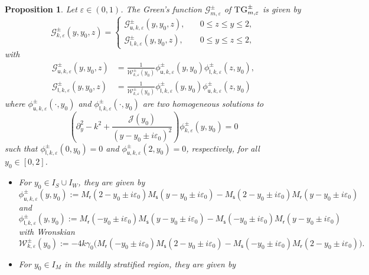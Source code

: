 \documentclass[11pt,reqno]{amsproc}
\newtheorem{proposition}{Proposition}[section]
\theoremstyle{definition}
\numberwithin{equation}{section}
\newcommand{\G}{{\mathcal{G}}}
\newcommand{\cJ}{{\mathcal{J}}}
\newcommand{\sr}{{\mathsf{r}}}
\newcommand{\s}{{\mathsf{s}}}
\newcommand{\su}{{\mathsf{u}}}
\renewcommand{\sl}{{\mathsf{l}}}
\newcommand{\W}{{\mathcal{W}}}
\newcommand{\ep}{\varepsilon}
\newcommand{\p}{\partial}
\begin{document}
\begin{proposition}\label{prop: def Green's Function}
Let  $\ep\in(0,1)$. The Green's function $\G_{m,\ep}^\pm$ of  $\textsc{TG}_{m,\ep}^\pm$
is given by
\begin{equation}\label{eq:Greens TG}
\G_{k,\ep}^\pm(y,y_0,z)=
\begin{cases}
\G_{\su,k,\ep}^\pm(y,y_0,z), \quad &0\leq z\leq y\leq 2,\\
\G_{\sl,k,\ep}^\pm(y,y_0,z), \quad &0\leq y\leq z\leq 2,
\end{cases}
\end{equation}
with
\begin{align}\label{ed:defGuGl}
\G_{\su,k,\ep}^\pm(y,y_0,z) &= \frac{1}{\W_{k,\ep}^\pm(y_0)}\phi_{\su,k,\ep}^\pm(y,y_0)\phi_{\sl,k,\ep}^\pm(z,y_0), \\ \G_{\sl,k,\ep}^\pm(y,y_0,z) &= \frac{1}{\W_{k,\ep}^\pm(y_0)}\phi_{\sl,k,\ep}^\pm(y,y_0)\phi_{\su,k,\ep}^\pm(z,y_0)
\end{align}
where  $\phi_{\su,k,\ep}^\pm(\cdot,y_0)$ and $\phi_{\sl,k,\ep}^\pm(\cdot,y_0)$ are two homogeneous solutions to 
\begin{equation}\label{eq:homTGoperator}
\left( \p_y^2 - k^2 + \frac{\cJ(y_0)}{(y-y_0 \pm i\ep_0)^2}\right) \phi_{k,\ep}^\pm(y,y_0) = 0 
\end{equation}
 such that  
$\phi_{\sl,k,\ep}^\pm(0,y_0)=0$ and $\phi_{\su,k,\ep}^\pm(2,y_0)=0$, respectively, for all $y_0\in [0,2]$. 
\begin{itemize}
\item For $y_0\in I_S\cup I_W$, they are given by
\begin{equation}\label{eq:homoupss}
\phi_{\su,k,\ep}^\pm(y,y_0):=M_\sr(2 - y_0\pm i\ep_0)M_\s(y- y_0\pm i\ep_0) - M_\s(2 - y_0\pm i\ep_0)M_\sr(y-y_0\pm i\ep_0)
\end{equation}
and
\begin{equation}\label{eq:homolowss}
\phi_{\sl,k,\ep}^\pm(y,y_0):=M_\sr(- y_0\pm i\ep_0)M_\s(y- y_0\pm i\ep_0) - M_\s( - y_0\pm i\ep_0)M_\sr(y-y_0\pm i\ep_0)
\end{equation}
with Wronskian 
\begin{equation}\label{eq:def Wronskianss}
\W_{k,\ep}^\pm(y_0):= -4k\gamma_0\Big( M_\sr( - y_0\pm i\ep_0)M_\s(2- y_0\pm i\ep_0) - M_\s( - y_0\pm i\ep_0)M_\sr(2-y_0\pm i\ep_0) \Big).
\end{equation} 
\item For $y_0\in I_M$ in the mildly stratified region, they are given by 
\begin{equation}\label{eq:homoupms}

\end{equation}
\end{itemize}
\end{proposition}
\end{document}
